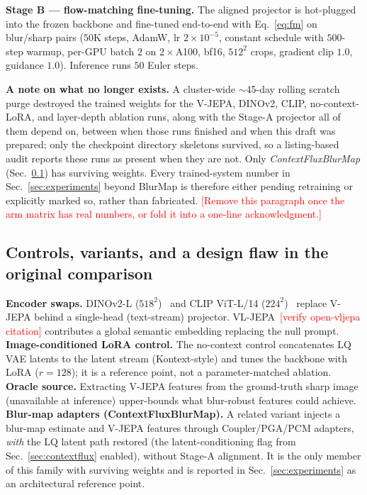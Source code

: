 \documentclass{article}
\newcommand{\authnote}[1]{\textcolor{red}{\footnotesize [#1]}}
\begin{document}
\textbf{Stage B — flow-matching fine-tuning.} The aligned projector is hot-plugged into the frozen backbone and fine-tuned end-to-end with Eq.~\eqref{eq:fm} on blur/sharp pairs ($50$K steps, AdamW, lr $2{\times}10^{-5}$, constant schedule with $500$-step warmup, per-GPU batch $2$ on $2{\times}$A100, bf16, $512^2$ crops, gradient clip $1.0$, guidance $1.0$). Inference runs $50$ Euler steps.

\textbf{A note on what no longer exists.} A cluster-wide $\sim$45-day rolling scratch purge destroyed the trained weights for the V-JEPA, DINOv2, CLIP, no-context-LoRA, and layer-depth ablation runs, along with the Stage-A projector all of them depend on, between when those runs finished and when this draft was prepared; only the checkpoint directory skeletons survived, so a listing-based audit reports these runs as present when they are not. Only \emph{ContextFluxBlurMap} (Sec.~\ref{sec:variants}) has surviving weights. Every trained-system number in Sec.~\ref{sec:experiments} beyond BlurMap is therefore either pending retraining or explicitly marked so, rather than fabricated. \authnote{Remove this paragraph once the arm matrix has real numbers, or fold it into a one-line acknowledgment.}

\subsection{Controls, variants, and a design flaw in the original comparison}
\label{sec:variants}
\textbf{Encoder swaps.} DINOv2-L ($518^2$)~\cite{oquab2023dinov2} and CLIP ViT-L/14 ($224^2$)~\cite{radford2021learning} replace V-JEPA behind a single-head (text-stream) projector. VL-JEPA~\cite{openvljepa}\authnote{verify open-vljepa citation} contributes a global semantic embedding replacing the null prompt.
\textbf{Image-conditioned LoRA control.} The no-context control concatenates LQ VAE latents to the latent stream (Kontext-style) and tunes the backbone with LoRA ($r{=}128$); it is a reference point, not a parameter-matched ablation.
\textbf{Oracle source.} Extracting V-JEPA features from the ground-truth sharp image (unavailable at inference) upper-bounds what blur-robust features could achieve.
\textbf{Blur-map adapters (ContextFluxBlurMap).} A related variant injects a blur-map estimate and V-JEPA features through Coupler/PGA/PCM adapters, \emph{with} the LQ latent path restored (the latent-conditioning flag from Sec.~\ref{sec:contextflux} enabled), without Stage-A alignment. It is the only member of this family with surviving weights and is reported in Sec.~\ref{sec:experiments} as an architectural reference point.
\end{document}
